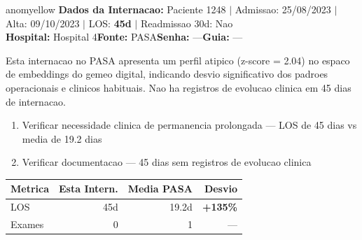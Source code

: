 \documentclass[a4paper,10pt]{article}
\begin{document}
\begin{anomalycard}[Internacao 107806 | PASA | MODERADO (z=2.04)]{anomyellow}
\textbf{Dados da Internacao:} Paciente 1248 $\mid$ Admissao: 25/08/2023 $\mid$ Alta: 09/10/2023 $\mid$ LOS: \textbf{45d} $\mid$ Readmissao 30d: Nao\\
\textbf{Hospital:} Hospital 4\quad\textbf{Fonte:} PASA\quad\textbf{Senha:} ---\quad\textbf{Guia:} ---\\
\vspace{2pt}\begin{tcolorbox}[colback=severityred!20,colframe=anomyellow,title={\textbf{Interpretacao de Negocio}},fonttitle=\bfseries\small,left=4pt,right=4pt,top=3pt,bottom=3pt]
{\small Esta internacao no PASA apresenta um perfil atipico (z-score = 2.04) no espaco de embeddings do gemeo digital, indicando desvio significativo dos padroes operacionais e clinicos habituais. Nao ha registros de evolucao clinica em 45 dias de internacao.}
\end{tcolorbox}
\begin{tcolorbox}[colback=severityyellow!30,colframe=anomorange,title={\textbf{Recomendacoes Especificas}},fonttitle=\bfseries\small,left=4pt,right=4pt,top=3pt,bottom=3pt]
\begin{enumerate}[nosep,leftmargin=16pt]
\item {\small Verificar necessidade clinica de permanencia prolongada --- LOS de 45 dias vs media de 19.2 dias}
\item {\small Verificar documentacao --- 45 dias sem registros de evolucao clinica}
\end{enumerate}
\end{tcolorbox}
\begin{center}\begin{tabular}{l r r r}\toprule\textbf{Metrica} & \textbf{Esta Intern.} & \textbf{Media PASA} & \textbf{Desvio} \\\midrule
LOS & 45d & 19.2d & \textcolor{anomred}{\textbf{+135\%}} \\
Exames & 0 & 1 & --- \\
\bottomrule\end{tabular}\end{center}


\end{anomalycard}
\end{document}

